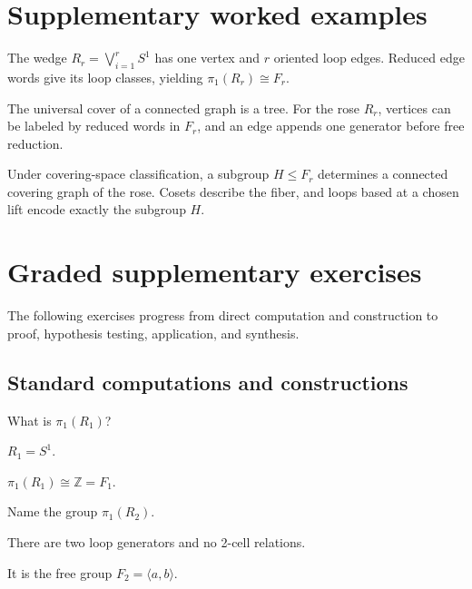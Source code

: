 \section{Supplementary worked examples}
\label{sec:viii14-pedagogy}

\begin{example}\label{ex:viii14-ped-01}
The wedge $R_r=\bigvee_{i=1}^r S^1$ has one vertex and $r$ oriented loop edges.  Reduced edge words give its loop classes, yielding $\pi_1(R_r)\cong F_r$.
\end{example}

\begin{example}\label{ex:viii14-ped-02}
The universal cover of a connected graph is a tree.  For the rose $R_r$, vertices can be labeled by reduced words in $F_r$, and an edge appends one generator before free reduction.
\end{example}

\begin{example}\label{ex:viii14-ped-03}
Under covering-space classification, a subgroup $H\le F_r$ determines a connected covering graph of the rose.  Cosets describe the fiber, and loops based at a chosen lift encode exactly the subgroup $H$.
\end{example}

\section{Graded supplementary exercises}
The following exercises progress from direct computation and construction to proof, hypothesis testing, application, and synthesis.

\subsection*{Standard computations and constructions}

\begin{exercise}\label{exr:viii14-ped-01}
What is $\pi_1(R_1)$?
\end{exercise}
\begin{hint}
$R_1=S^1$.
\end{hint}
\begin{solution}
$\pi_1(R_1)\cong\mathbb Z=F_1$.
\end{solution}

\begin{exercise}\label{exr:viii14-ped-02}
Name the group $\pi_1(R_2)$.
\end{exercise}
\begin{hint}
There are two loop generators and no 2-cell relations.
\end{hint}
\begin{solution}
It is the free group $F_2=\langle a,b\rangle$.
\end{solution}


